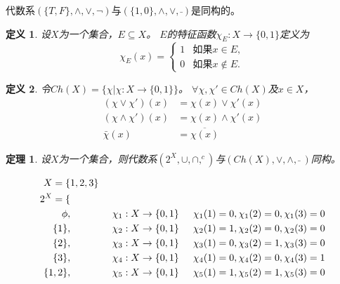 \documentclass{article}
\newtheorem{Def}{定义}
\newtheorem{Thm}{定理}
\begin{document}
\begin{CJK*}{UTF8}{gbsn}
代数系$(\{T,F\},\land,\lor,\lnot)$与$(\{1,0\},\land, \lor,\bar{ })$是同构的。
  \begin{Def}
    设$X$为一个集合，$E \subseteq X$。 $E$的特征函数$\chi_E:X\to \{0,1\}$定义为
    \begin{equation*}
      \chi_E(x)=
      \begin{cases}
        1 & \text{如果} x \in E,\\
        0 & \text{如果} x \notin E.
      \end{cases}
    \end{equation*}
  \end{Def}
  \begin{Def}
    令$Ch(X) = \{\chi |\chi:X \to \{0,1\}\}$。
    $\forall \chi, \chi' \in Ch(X)$及$x \in X$，
    \begin{align}
      (\chi \lor \chi')(x) &= \chi(x) \lor \chi'(x)\nonumber\\
      (\chi \land \chi')(x) &= \chi(x) \land \chi'(x)\nonumber\\
      \bar{\chi}(x) &=   \overline{\chi(x)}
    \end{align}
  \end{Def}
  \begin{Thm}
    设$X$为一个集合，则代数系$(2^X, \cup, \cap, ^c)$与$(Ch(X), \lor, \land, \bar{} \ )$同构。
  \end{Thm}
  \begin{align*}
    X=\{&1,2,3\}\\
    2^X=\{&\\
        \phi,&\hspace{1.5cm}\chi_1:X\to \{0,1\}\hspace{0.5cm} \chi_1(1)=0,\chi_1(2)=0,\chi_1(3)=0\\
    \{1\},&\hspace{1.5cm}\chi_2:X\to \{0,1\}\hspace{0.5cm} \chi_2(1)=1,\chi_2(2)=0,\chi_2(3)=0\\
        \{2\},&\hspace{1.5cm}\chi_3:X\to \{0,1\}\hspace{0.5cm} \chi_3(1)=0,\chi_3(2)=1,\chi_3(3)=0\\
    \{3\},&\hspace{1.5cm}\chi_4:X\to \{0,1\}\hspace{0.5cm} \chi_4(1)=0,\chi_4(2)=0,\chi_4(3)=1\\
    \{1,2\},&\hspace{1.5cm}\chi_5:X\to \{0,1\}\hspace{0.5cm} \chi_5(1)=1,\chi_5(2)=1,\chi_5(3)=0\\

\end{align*}
\end{CJK*}
\end{document}
